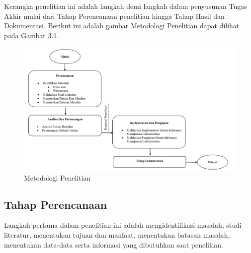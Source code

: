%
%
%
%


\chapter{\babTiga}
Kerangka penelitian ini adalah langkah demi langkah dalam penyusunan Tugas Akhir mulai dari Tahap Perencanaan penelitian hingga Tahap Hasil dan Dokumentasi. Berikut ini adalah gambar Metodologi Penelitian dapat dilihat pada Gambar 3.1.
\begin{figure}
	\centering
	\includegraphics[width=0.92\linewidth]{konten//gambar/metodologi-penelitian.png}
	\caption{Metodologi Penelitian}
	\label{fig:enter-label}
\end{figure}

\section{Tahap Perencanaan}
Langkah pertama dalam penelitian ini adalah mengidentifikasi masalah, studi literatur, menentukan tujuan dan manfaat, menentukan batasan masalah, menentukan data-data serta informasi yang dibutuhkan saat penelitian.

